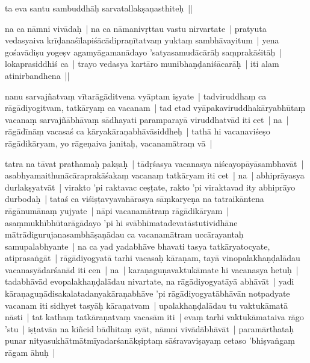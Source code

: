 \documentclass[article,12pt,a4paper]{memoir}%
\newcounter{parCount}
\begin{document}
	  \pstart \leavevmode%
	ta eva santu sambuddhāḥ sarvatallakṣaṇasthiteḥ || 
	{}
	\pend%
      

	  \pstart \leavevmode%
	\label{thakur75-26.3}na ca nāmni vivādaḥ | na ca nāmanivṛttau vastu nirvartate | pratyuta vedasyaiva krīḍanaśīlapiśācādipraṇītatvaṃ yuktaṃ sambhāvayitum | yena gośavādiṣu yogeṣv agamyāgamanādayo 'satyasamudācārāḥ saṃprakāśitāḥ | lokaprasiddhiś ca | trayo vedasya kartāro munibhaṇḍaniśācarāḥ | iti alam atinirbandhena || 
	{}
	\pend%
      

	  \pstart \leavevmode%
	\label{thakur75-26.9}nanu sarvajñatvaṃ vītarāgāditvena vyāptam iṣyate | tadviruddhaṃ ca rāgādiyogitvam, tatkāryaṃ ca vacanam | tad etad vyāpakaviruddhakāryabhūtaṃ vacanaṃ sarvajñābhāvaṃ sādhayati paramparayā viruddhatvād iti cet | na | rāgādīnāṃ vacasaś ca kāryakāraṇabhāvāsiddheḥ | tathā hi vacanaviśeṣo rāgādikāryam, yo rāgeṇaiva janitaḥ, vacanamātraṃ vā | 
	{}
	\pend%
      

	  \pstart \leavevmode%
	\label{thakur75-26.13}tatra na tāvat prathamaḥ pakṣaḥ | tādṛśasya vacanasya niścayopāyāsambhavāt | asabhyamaithunācāraprakāśakaṃ vacanaṃ tatkāryam iti cet | na | abhiprāyasya durlakṣyatvāt | virakto 'pi raktavac ceṣṭate, rakto 'pi viraktavad ity abhiprāyo durbodaḥ | tataś ca viśiṣṭavyavahārasya sāṃkaryeṇa na tatraikāntena rāgānumānaṃ yujyate | nāpi vacanamātraṃ rāgādikāryam | asaṃmukhībhūtarāgādayo 'pi hi svābhimatadevatāstutividhāne mātrādigurujanasambhāṣaṇādau ca vacanamātram uccārayantaḥ samupalabhyante | na ca yad yadabhāve bhavati tasya tatkāryatocyate, atiprasaṅgāt | rāgādiyogyatā tarhi vacasaḥ kāraṇam, tayā vinopalakhaṇḍalādau vacanasyādarśanād iti cen | na | karaṇaguṇavaktukāmate hi vacanasya hetuḥ | tadabhāvād evopalakhaṇḍalādau nivartate, na rāgādiyogyatāyā abhāvāt | yadi kāraṇaguṇādisakalatadanyakāraṇabhāve 'pi rāgādiyogyatābhāvān notpadyate vacanam iti sidhyet tasyāḥ kāraṇatvam | upalakhaṇḍalādau tu vaktukāmatā nāsti | tat kathaṃ tatkāraṇatvaṃ vacasām iti | evaṃ tarhi vaktukāmataiva rāgo 'stu | iṣṭatvān na kiñcid bādhitaṃ syāt, nāmni vivādābhāvāt | paramārthataḥ punar nityasukhātmātmīyadarśanākṣiptaṃ sāśravaviṣayaṃ cetaso 'bhiṣvaṅgaṃ rāgam āhuḥ | 
	{}
	\pend%
      
\end{document}
